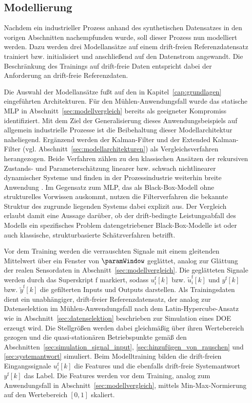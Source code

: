 \subsection{Modellierung} \label{sec:syn_modellierung}
%

%
Nachdem ein industrieller Prozess anhand des synthetischen Datensatzes in den vorigen Abschnitten nachempfunden wurde, soll dieser Prozess nun modelliert werden. Dazu werden drei Modellansätze auf einem drift-freien Referenzdatensatz trainiert bzw. initialisiert und anschließend auf den Datenstrom angewandt. Die Beschränkung des Trainings auf drift-freie Daten entspricht dabei der Anforderung an drift-freie Referenzdaten. \par
Die Auswahl der Modellansätze fußt auf den in  Kapitel~\ref{cap:grundlagen} eingeführten Architekturen. Für den Mühlen-Anwendungsfall wurde das statische \ac{MLP} in Abschnitt~\ref{sec:modellvergleich} bereits als geeigneter Kompromiss identifiziert. Mit dem Ziel der Generalisierung dieses Anwendungsbeispiels auf allgemein industrielle Prozesse ist die Beibehaltung dieser Modellarchitektur naheliegend. Ergänzend werden der Kalman-Filter und der Extended Kalman-Filter (vgl. Abschnitt~\ref{sec:modellarchitekturen}) als Vergleichsverfahren herangezogen. 
Beide Verfahren zählen zu den klassischen Ansätzen der rekursiven Zustands- und Parameterschätzung linearer bzw. schwach nichtlinearer dynamischer Systeme und finden in der Prozessindustrie weiterhin breite Anwendung \cite{kalman.1960, welch.1995}. Im Gegensatz zum \ac{MLP}, das als Black-Box-Modell ohne strukturelles Vorwissen auskommt, nutzen die Filterverfahren die bekannte Struktur des zugrunde liegenden Systems dabei explizit aus. Der Vergleich erlaubt damit eine Aussage darüber, ob der drift-bedingte Leistungsabfall des Modells ein spezifisches Problem datengetriebener Black-Box-Modelle ist oder auch klassische, strukturbasierte Schätzverfahren betrifft. \par
Vor dem Training werden die verrauschten Signale mit einem gleitenden Mittelwert über ein Fenster von $\paramWindow$ geglättet, analog zur Glättung der realen Sensordaten in Abschnitt~\ref{sec:modellvergleich}. Die geglätteten Signale werden durch das Superskript $\mathrm{f}$ markiert, sodass $u_i^{\mathrm{f}}[k]$ bzw. $\tilde{u}_i^{\mathrm{f}}[k]$ und $y^{\mathrm{f}}[k]$ bzw. $\tilde{y}^{\mathrm{f}}[k]$ die gefilterten Inputs und Outputs darstellen. Als Trainingsdaten dient ein unabhängiger, drift-freier Referenzdatensatz, der analog zur Datenselektion im Mühlen-Anwendungsfall nach dem Latin-Hypercube-Ansatz wie in Abschnitt~\ref{sec:datenselektion} beschrieben zur Simulation eines \ac{DOE} erzeugt wird. Die Stellgrößen werden dabei gleichmäßig über ihren Wertebereich gezogen und die quasi-stationären Betriebspunkte gemäß den Abschnitten~\ref{sec:simulation_signal_input}, \ref{sec:hinzufügen_von_rauschen} und \ref{sec:systemantwort} simuliert. Beim Modelltraining bilden die drift-freien Eingangssignale $u_i^{\mathrm{f}}[k]$ die Features und die ebenfalls drift-freie Systemantwort $y^{\mathrm{f}}[k]$ das Label. Die Features werden vor dem Training, analog zum Anwendungsfall in Abschnitt~\ref{sec:modellvergleich}, mittels Min-Max-Normierung auf den Wertebereich $[0,1]$ skaliert. \par
